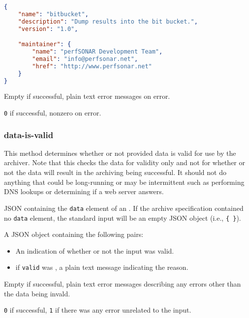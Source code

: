 \documentclass[10pt,titlepage]{article}
\begin{document}
\example
\begin{lstlisting}[language=json,firstnumber=1]
{
    "name": "bitbucket",
    "description": "Dump results into the bit bucket.",
    "version": "1.0",

    "maintainer": {
        "name": "perfSONAR Development Team",
        "email": "info@perfsonar.net",
        "href": "http://www.perfsonar.net"
    }
}
\end{lstlisting}

 Empty if successful, plain text error
messages on error.

 {\tt 0} if successful, nonzero on error.



\subsubsection{data-is-valid}

This method determines whether or not provided data is valid for use
by the archiver.  Note that this checks the data for validity only and
not for whether or not the data will result in the archiving being
successful.  It should not do anything that could be long-running or
may be intermittent such as performing DNS lookups or determining if a
web server answers.

 JSON containing the {\tt data} element of
an .  If the archive specification
contained no {\tt data} element, the standard input will be an empty
JSON object (i.e., {\tt \{ \}}).

 A JSON object containing the following pairs:

\begin{itemize}
\item {} An indication of whether or not the
  input was valid.

\item {} if {\tt valid} was \false, a plain
  text message indicating the reason.
\end{itemize}


 Empty if successful, plain text error
messages describing any errors other than the data being invald.

 {\tt 0} if successful, {\tt 1} if there was
any error unrelated to the input.
\end{document}
